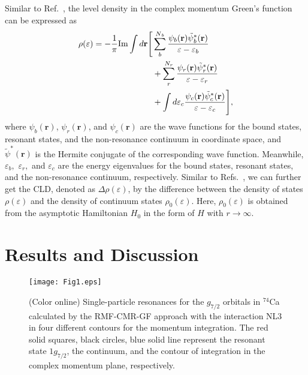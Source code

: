 \documentclass[twocolumn,prc,preprintnumbers,superscriptaddress,floatfix,showpacs]{revtex4}
\begin{document}
Similar to Ref.~\cite{Myo2014}, the level density in the complex momentum Green's function can be expressed as
\begin{align}
\rho (\varepsilon ) =-\frac{1}{\pi }\mathrm{Im}\int {d\mathbf{r}}\Bigg[ & %
\sum_{{b}}^{N{_{b}}}\frac{\psi _{b}({\mathbf{r}})\tilde{\psi}{_{b}^{\ast }(%
\mathbf{r})}}{\varepsilon -\varepsilon _{b}}  \notag \\
&+\sum_{{r}}^{N_{r}}\frac{\psi _{r}({\mathbf{r}})\tilde{\psi}{_{r}^{\ast }(%
\mathbf{r})}}{\varepsilon -\varepsilon _{r}}  \notag \\
&+\int d\varepsilon _{c}\frac{\psi _{c}({\mathbf{r}})\tilde{\psi}_{c}^{\ast
}{(\mathbf{r})}}{\varepsilon -\varepsilon _{c}}\Bigg],  \label{density}
\end{align}
where $\psi _{b}({\mathbf{r}})$, $\psi _{r}({\mathbf{r}})$, and $\psi _{c}({\mathbf{r}})$ are the wave functions for the bound states, resonant states, and the non-resonance continuum in coordinate space, and $\tilde{\psi}^{\ast }({\mathbf{r}})$ is the Hermite conjugate of the corresponding wave function. Meanwhile, $\varepsilon _{b},$ $\varepsilon _{r},$ and $\varepsilon _{c}$ are the energy eigenvalues for the bound states, resonant states, and the non-resonance continuum, respectively. Similar to Refs.~\cite{Suzuki2005,Shi2014,Shi2017,Myo2014}, we can further get the CLD, denoted as $\Delta \rho (\varepsilon )$, by the difference between the density of states $\rho (\varepsilon )$ and the density of continuum states $\rho _{0}(\varepsilon )$. Here, $\rho_{0}(\varepsilon )$ is obtained from the asymptotic Hamiltonian $H_{0}$ in the form of $H$ with $r\rightarrow \infty $.


\section{Results and Discussion}\label{Sec:Results}

\begin{figure}%
\texttt{[image: Fig1.eps]}
\caption{(Color online) Single-particle resonances for the $g_{7/2}$ orbitals in $^{74}$Ca calculated by the RMF-CMR-GF approach with the interaction NL3 in four different contours for the momentum integration. The red solid squares, black circles, blue solid line represent the resonant state $1g_{7/2}$, the continuum, and the contour of integration in the complex momentum plane, respectively.}
\label{Fig1}
\end{figure}
\end{document}
